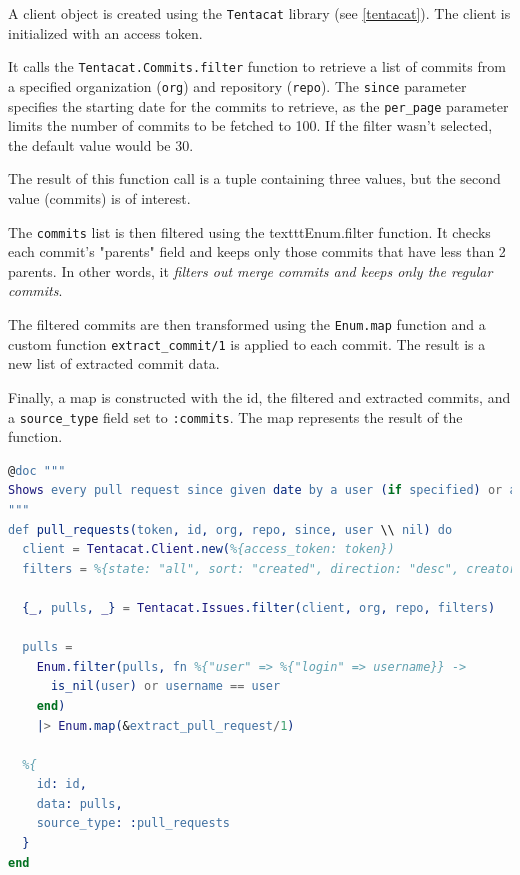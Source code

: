A client object is created using the \texttt{Tentacat} library (see \ref{tentacat}). The client is initialized with an access token.

It calls the \texttt{Tentacat.Commits.filter} function to retrieve a list of commits from a specified organization (\texttt{org}) and repository (\texttt{repo}). The \texttt{since} parameter specifies the starting date for the commits to retrieve, as the \texttt{per\_page} parameter limits the number of commits to be fetched to 100. If the filter wasn't selected, the default value would be 30. 

The result of this function call is a tuple containing three values, but the second value (commits) is of interest.

The \texttt{commits} list is then filtered using the texttt{Enum.filter function}. It checks each commit's "parents" field and keeps only those commits that have less than 2 parents. In other words, it \textit{filters out merge commits and keeps only the regular commits}.

The filtered commits are then transformed using the \texttt{Enum.map} function and a custom function \texttt{extract\_commit/1} is applied to each commit. The result is a new list of extracted commit data.

Finally, a map is constructed with the id, the filtered and extracted commits, and a \texttt{source\_type} field set to \texttt{:commits}. The map represents the result of the function.\newline


\begin{lstlisting}[language=erlang, caption={Pull requests extraction of extractor\_github.ex}]
@doc """
Shows every pull request since given date by a user (if specified) or all users (if null)
"""
def pull_requests(token, id, org, repo, since, user \\ nil) do
  client = Tentacat.Client.new(%{access_token: token})
  filters = %{state: "all", sort: "created", direction: "desc", creator: user, since: since}

  {_, pulls, _} = Tentacat.Issues.filter(client, org, repo, filters)

  pulls =
    Enum.filter(pulls, fn %{"user" => %{"login" => username}} ->
      is_nil(user) or username == user
    end)
    |> Enum.map(&extract_pull_request/1)

  %{
    id: id,
    data: pulls,
    source_type: :pull_requests
  }
end
\end{lstlisting}

